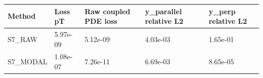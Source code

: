 \begin{tabular}{lllll}
\hline
Method & Loss pT & Raw coupled PDE loss & y\_parallel relative L2 & y\_perp relative L2 \\
\hline
S7\_RAW & 5.97e-09 & 5.12e-09 & 4.03e-03 & 1.65e-01 \\
S7\_MODAL & 1.08e-07 & 7.26e-11 & 6.69e-03 & 8.65e-05 \\
\hline
\end{tabular}
